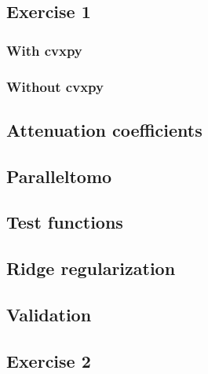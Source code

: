 \documentclass{article}
\begin{document}
\subsection{Exercise 1}
\subsubsection{With cvxpy}\label{appendix:exercise-1-cvxpy}


\subsubsection{Without cvxpy}\label{appendix:exercise-1}


\subsection{Attenuation coefficients}\label{appendix:attenuation-coefficients}


\subsection{Paralleltomo}\label{appendix:paralleltomo}


\subsection{Test functions}\label{appendix:generate-test-functions}


\subsection{Ridge regularization}\label{appendix:ridge-regularization}


\subsection{Validation}\label{appendix:validation}


\subsection{Exercise 2}\label{appendix:exercise-2}

\end{document}
